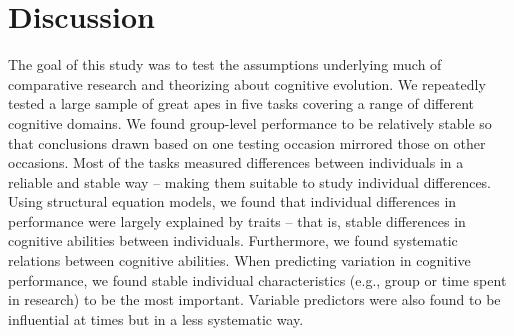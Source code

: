 \documentclass[
  man,floatsintext]{apa6}
\begin{document}
\hypertarget{discussion}{%
\section{Discussion}\label{discussion}}

The goal of this study was to test the assumptions underlying much of comparative research and theorizing about cognitive evolution. We repeatedly tested a large sample of great apes in five tasks covering a range of different cognitive domains. We found group-level performance to be relatively stable so that conclusions drawn based on one testing occasion mirrored those on other occasions. Most of the tasks measured differences between individuals in a reliable and stable way -- making them suitable to study individual differences. Using structural equation models, we found that individual differences in performance were largely explained by traits -- that is, stable differences in cognitive abilities between individuals. Furthermore, we found systematic relations between cognitive abilities. When predicting variation in cognitive performance, we found stable individual characteristics (e.g., group or time spent in research) to be the most important. Variable predictors were also found to be influential at times but in a less systematic way.
\end{document}
